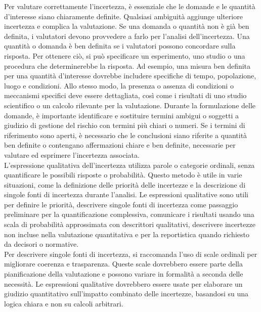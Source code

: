 Per valutare correttamente l'incertezza, è essenziale che le domande e le quantità d'interesse siano chiaramente definite. Qualsiasi ambiguità aggiunge ulteriore incertezza e complica la valutazione. Se una domanda o quantità non è già ben definita, i valutatori devono provvedere a farlo per l'analisi dell'incertezza. Una quantità o domanda è ben definita se i valutatori possono concordare sulla risposta. Per ottenere ciò, si può specificare un esperimento, uno studio o una procedura che determinerebbe la risposta. Ad esempio, una misura ben definita per una quantità d'interesse dovrebbe includere specifiche di tempo, popolazione, luogo e condizioni. Allo stesso modo, la presenza o assenza di condizioni o meccanismi specifici deve essere dettagliata, così come i risultati di uno studio scientifico o un calcolo rilevante per la valutazione. Durante la formulazione delle domande, è importante identificare e sostituire termini ambigui o soggetti a giudizio di gestione del rischio con termini più chiari o numeri. Se i termini di riferimento sono aperti, è necessario che le conclusioni siano riferite a quantità ben definite o contengano affermazioni chiare e ben definite, necessarie per valutare ed esprimere l'incertezza associata.\\

L'espressione qualitativa dell'incertezza utilizza parole o categorie ordinali, senza quantificare le possibili risposte o probabilità. Questo metodo è utile in varie situazioni, come la definizione delle priorità delle incertezze e la descrizione di singole fonti di incertezza durante l'analisi. Le espressioni qualitative sono utili per definire le priorità, descrivere singole fonti di incertezza come passaggio preliminare per la quantificazione complessiva, comunicare i risultati usando una scala di probabilità approssimata con descrittori qualitativi, descrivere incertezze non incluse nella valutazione quantitativa e per la reportistica quando richiesto da decisori o normative.\\

Per descrivere singole fonti di incertezza, si raccomanda l'uso di scale ordinali per migliorare coerenza e trasparenza. Queste scale dovrebbero essere parte della pianificazione della valutazione e possono variare in formalità a seconda delle necessità. Le espressioni qualitative dovrebbero essere usate per elaborare un giudizio quantitativo sull'impatto combinato delle incertezze, basandosi su una logica chiara e non su calcoli arbitrari.\\


